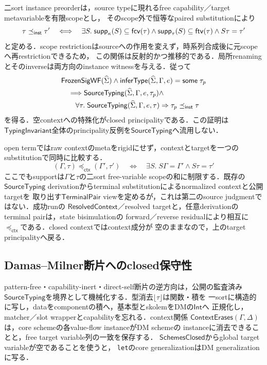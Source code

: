 二sort instance preorderは，source typeに現れるfree capability／target metavariableを有限scopeとし，
そのscope外で恒等なpaired substitutionにより
\[
\tau\preceq_{\mathsf{inst}}\tau'
\quad\Longleftrightarrow\quad
\exists S.\;\mathsf{supp}_\kappa(S)\subseteq\mathsf{fcv}(\tau)\land
\mathsf{supp}_\tau(S)\subseteq\mathsf{ftv}(\tau)\land S\tau=\tau'
\]
と定める．scope restrictionはsourceへの作用を変えず，時系列合成後に元scopeへ再restrictionできるため，
この関係は反射的かつ推移的である．局所renamingとそのinverseは両方向のinstance witnessを与える．従って
\[
\begin{aligned}
&\mathsf{FrozenSigWF}(\widehat{\Sigma})\land
  \mathsf{inferType}(\widehat{\Sigma},\Gamma,e)=\mathsf{some}\;\tau_p\\
&\quad\Longrightarrow
  \mathsf{SourceTyping}(\widehat{\Sigma},\Gamma,e,\tau_p)\land\\
&\qquad\forall\tau.\;\mathsf{SourceTyping}(\widehat{\Sigma},\Gamma,e,\tau)
  \Rightarrow\tau_p\preceq_{\mathsf{inst}}\tau
\end{aligned}
\]
を得る．空contextへの特殊化がclosed principalityである．この証明は
$\mathsf{TypingInvariant}$全体のprincipality反例を$\mathsf{SourceTyping}$へ流用しない．

open termではraw contextのmetaをrigidにせず，contextとtargetを一つのsubstitutionで同時に比較する．
\[
(\Gamma,\tau)\preceq_{\mathsf{ctx}}(\Gamma',\tau')
\quad\Longleftrightarrow\quad
\exists S.\;S\Gamma=\Gamma'\land S\tau=\tau'
\]
ここでもsupportは$\Gamma$と$\tau$の二sort free-variable scopeの和に制限する．既存の
$\mathsf{SourceTyping}$ derivationからterminal substitutionによるnormalized contextと公開targetを
取り出す$\mathsf{TerminalPair}$ viewを定めるが，これは第二のsource judgmentではない．成功runの
$\mathsf{ResolvedContext}$／resolved targetと，任意derivationのterminal pairは，state bisimulationの
forward／reverse residualにより相互に$\preceq_{\mathsf{ctx}}$である．closed contextではcontext成分が
空のままなので，上のtarget principalityへ戻る．

\subsection{Damas--Milner断片へのclosed保守性}

pattern-free・capability-inert・direct-self断片の逆方向は，公開の監査済み
$\mathsf{SourceTyping}$を境界として機械化する．型消去$\lfloor\tau\rfloor$は関数・積を
一sortに構造的に写し，dataをcomponentの積へ，基本型とskolemをDMの$\mathsf{Int}$へ
正規化し，matcher／slot wrapperとcapabilityを忘れる．context関係
$\mathsf{ContextErases}(\Gamma,\Delta)$は，core schemeの各value-flow instanceがDM schemeの
instanceに消去できることと，free target variable列の一致を保存する．
$\mathsf{SchemesClosed}$からglobal target variableが空であることを使うと，
\texttt{let}のcore generalizationはDM generalizationに写る．

